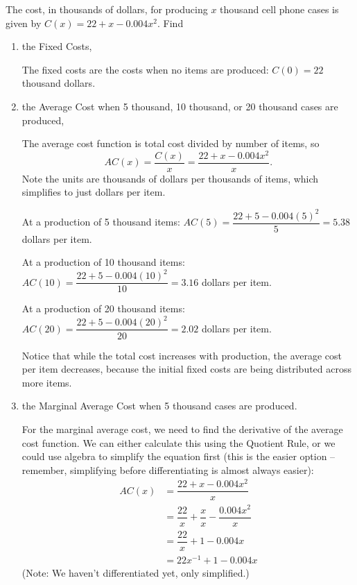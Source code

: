 \begin{example}
The cost, in thousands of dollars, for producing $x$ thousand cell phone cases is given by $C(x)=22+x-0.004x^2$. Find
    \begin{enumerate}[label=(\alph*)]
    \item the Fixed Costs,

    \begin{solution}
    The fixed costs are the costs when no items are produced: $C(0)=22$ thousand dollars.
    \end{solution}
    \item the Average Cost when 5 thousand, 10 thousand, or 20 thousand cases are produced,

    \begin{solution}
    The average cost function is total cost divided by number of items, so
$$AC(x)=\dfrac{C(x)}{x}=\dfrac{22+x-0.004x^2}{x}. $$
Note the units are thousands of dollars per thousands of items, which simplifies to just dollars per item.

At a production of 5 thousand items: $ AC(5)=\dfrac{22+5-0.004(5)^2}{5}=5.38 $ dollars per item.

At a production of 10 thousand items: $ AC(10)=\dfrac{22+5-0.004(10)^2}{10}=3.16 $ dollars per item.

At a production of 20 thousand items: $ AC(20)=\dfrac{22+5-0.004(20)^2}{20}=2.02 $ dollars per item.

Notice that while the total cost increases with production, the average cost per item decreases, because the initial fixed costs are being distributed across more items.
    \end{solution}
    \item the Marginal Average Cost when 5 thousand cases are produced.

    \begin{solution} 
    For the marginal average cost, we need to find the derivative of the average cost function. We can either calculate this using the Quotient Rule, or we could use algebra to simplify the equation first (this is the easier option -- remember, simplifying before differentiating is almost always easier):
    \begin{align*}
					AC(x) &= \dfrac{22+x-0.004x^2}{x} \\
					 &= \dfrac{22}{x}+\dfrac{x}{x}-\dfrac{0.004x^2}{x} \\
					 &= \dfrac{22}{x}+1-0.004x \\
					 &= 22x^{-1}+1-0.004x
\end{align*}
(Note: We haven't differentiated yet, only simplified.)


\end{solution}
\end{enumerate}
\end{example}
